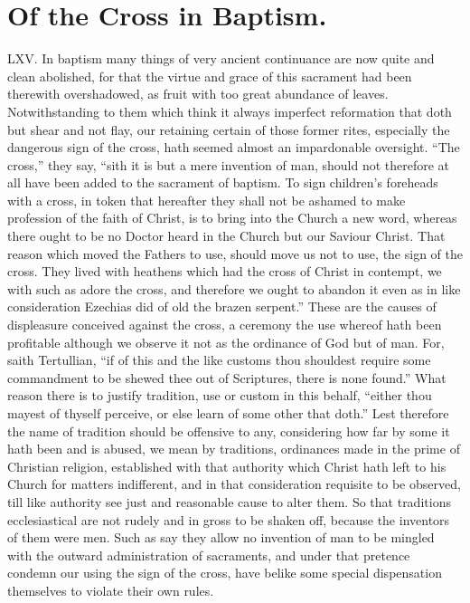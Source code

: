 \section*{Of the Cross in Baptism.}
LXV. In baptism many things of very ancient continuance are now quite and clean abolished, for that the virtue and grace of this sacrament had been therewith overshadowed, as fruit with too great abundance of leaves. Notwithstanding to them which think it always imperfect reformation that doth but shear and not flay, our retaining certain of those former rites, especially the dangerous sign of the cross, hath seemed almost an impardonable oversight. “The cross,” they say, “sith it is but a mere invention of man, should not therefore at all have been added to the sacrament of baptism. To sign children’s foreheads with a cross, in token that hereafter they shall not be ashamed to make profession of the faith of Christ, is to bring into the Church a new word, whereas there ought to be no Doctor heard in the Church but our Saviour Christ. That reason which moved the Fathers to use, should move us not to use, the sign of the cross. They lived with heathens which had the cross of Christ in contempt, we with such as adore the cross, and  therefore we ought to abandon it even as in like consideration Ezechias did of old the brazen serpent.”
These are the causes of displeasure conceived against the cross, a ceremony the use whereof hath been profitable although we observe it not as the ordinance of God but of man. For, saith Tertullian, “if of this and the like customs thou shouldest require some commandment to be shewed thee out of Scriptures, there is none found.” What reason there is to justify tradition, use or custom in this behalf, “either thou mayest of thyself perceive, or else learn of some other that doth.” Lest therefore the name of tradition should be offensive to any, considering how far by some it hath been and is abused, we mean by traditions, ordinances made in the prime of Christian religion, established with that authority which Christ hath left to his Church for matters indifferent, and in that consideration requisite to be observed, till like authority see just and reasonable cause to alter them. So that traditions ecclesiastical are not rudely and in gross to be shaken off, because the inventors of them were men.
Such as say they allow no invention of man to be  mingled with the outward administration of sacraments, and under that pretence condemn our using the sign of the cross, have belike some special dispensation themselves to violate their own rules.
